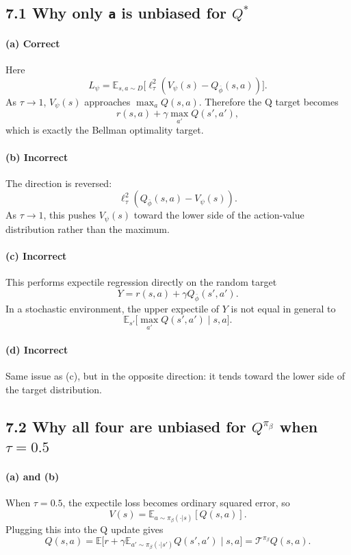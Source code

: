 \documentclass[11pt]{article}
\newcommand{\E}{\mathbb{E}}
\newcommand{\1}{\mathbf{1}}
\begin{document}
\subsection*{7.1 Why only \texttt{a} is unbiased for $Q^*$}
\paragraph{(a) Correct}
Here
\[
L_\psi=\E_{s,a\sim D}\big[\ell_\tau^2(V_\psi(s)-Q_{\bar\phi}(s,a))\big].
\]
As $\tau\to 1$, $V_\psi(s)$ approaches $\max_a Q(s,a)$. Therefore the Q target becomes
\[
r(s,a)+\gamma \max_{a'}Q(s',a'),
\]
which is exactly the Bellman optimality target.

\paragraph{(b) Incorrect}
The direction is reversed:
\[
\ell_\tau^2(Q_{\bar\phi}(s,a)-V_\psi(s)).
\]
As $\tau\to 1$, this pushes $V_\psi(s)$ toward the lower side of the action-value distribution rather than the maximum.

\paragraph{(c) Incorrect}
This performs expectile regression directly on the random target
\[
Y=r(s,a)+\gamma Q_{\bar\phi}(s',a').
\]
In a stochastic environment, the upper expectile of $Y$ is not equal in general to
\[
\E_{s'}\big[\max_{a'}Q(s',a')\mid s,a\big].
\]

\paragraph{(d) Incorrect}
Same issue as (c), but in the opposite direction: it tends toward the lower side of the target distribution.

\subsection*{7.2 Why all four are unbiased for $Q^{\pi_\beta}$ when $\tau=0.5$}
\paragraph{(a) and (b)}
When $\tau=0.5$, the expectile loss becomes ordinary squared error, so
\[
V(s)=\E_{a\sim \pi_\beta(\cdot|s)}[Q(s,a)].
\]
Plugging this into the Q update gives
\[
Q(s,a)
=
\E\big[r+\gamma \E_{a'\sim \pi_\beta(\cdot|s')}Q(s',a')\mid s,a\big]
= \mathcal T^{\pi_\beta}Q(s,a).
\]
\end{document}
